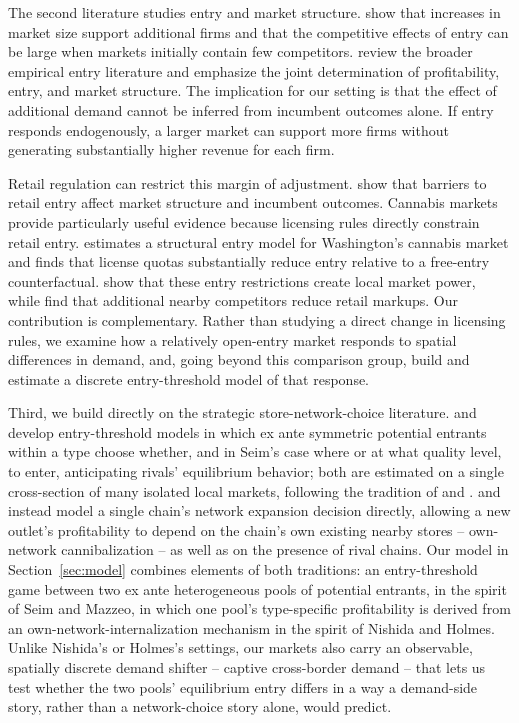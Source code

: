 \documentclass[english,12pt]{article}
\begin{document}
The second literature studies entry and market structure. \citet{BresnahanReiss1991} show that increases in market size support additional firms and that the competitive effects of entry can be large when markets initially contain few competitors. \citet{BerryReiss2007} review the broader empirical entry literature and emphasize the joint determination of profitability, entry, and market structure. The implication for our setting is that the effect of additional demand cannot be inferred from incumbent outcomes alone. If entry responds endogenously, a larger market can support more firms without generating substantially higher revenue for each firm.

Retail regulation can restrict this margin of adjustment. \citet{SchivardiViviano2011} show that barriers to retail entry affect market structure and incumbent outcomes. Cannabis markets provide particularly useful evidence because licensing rules directly constrain retail entry. \citet{Thomas2019} estimates a structural entry model for Washington's cannabis market and finds that license quotas substantially reduce entry relative to a free-entry counterfactual. \citet{HollenbeckUetake2021} show that these entry restrictions create local market power, while \citet{HollenbeckHristakevaUetake2026} find that additional nearby competitors reduce retail markups. Our contribution is complementary. Rather than studying a direct change in licensing rules, we examine how a relatively open-entry market responds to spatial differences in demand, and, going beyond this comparison group, build and estimate a discrete entry-threshold model of that response.

Third, we build directly on the strategic store-network-choice literature. \citet{Seim2006} and \citet{Mazzeo2002} develop entry-threshold models in which ex ante symmetric potential entrants within a type choose whether, and in Seim's case where or at what quality level, to enter, anticipating rivals' equilibrium behavior; both are estimated on a single cross-section of many isolated local markets, following the tradition of \citet{BresnahanReiss1991} and \citet{BresnahanReiss1990}. \citet{Nishida2008} and \citet{Holmes2011} instead model a single chain's network expansion decision directly, allowing a new outlet's profitability to depend on the chain's own existing nearby stores -- own-network cannibalization -- as well as on the presence of rival chains. Our model in Section~\ref{sec:model} combines elements of both traditions: an entry-threshold game between two ex ante heterogeneous pools of potential entrants, in the spirit of Seim and Mazzeo, in which one pool's type-specific profitability is derived from an own-network-internalization mechanism in the spirit of Nishida and Holmes. Unlike Nishida's or Holmes's settings, our markets also carry an observable, spatially discrete demand shifter -- captive cross-border demand -- that lets us test whether the two pools' equilibrium entry differs in a way a demand-side story, rather than a network-choice story alone, would predict.
\end{document}
